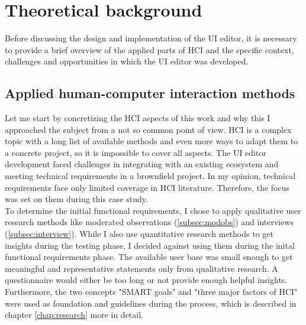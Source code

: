 
%
\chapter{Theoretical background}
\label{chap:background}

Before discussing the design and implementation of the UI editor, it is necessary to provide a brief overview of the applied parts of HCI and the specific context, challenges and opportunities in which the UI editor was developed.
% 

\section{Applied human-computer interaction methods}

Let me start by concretizing the HCI aspects of this work and why this I approached the subject from a not so common point of view.
HCI is a complex topic with a long list of available methods and even more ways to adapt them to a concrete project, so it is impossible to cover all aspects.
The UI editor development faced challenges in integrating with an existing ecosystem and meeting technical requirements in a \gls{brownfield} project.
In my opinion, technical requirements face only limited coverage in HCI literature.
Therefore, the focus was set on them during this case study.
\\
To determine the initial functional requirements, I chose to apply qualitative user research methods like moderated observations (\ref{subsec:modobs}) and interviews (\ref{subsec:interview}).
While I also use quantitative research methods to get insights during the testing phase, I decided against using them during the inital functional requirements phase.
The available user base was small enough to get meaningful and representative statements only from qualitative research.
A questionnaire would either be too long or not provide enough helpful insights.
\\
Furthermore, the two concepts "SMART goals" and "three major factors of HCI" were used as foundation and guidelines during the process, which is described in chapter \ref{chap:research} more in detail.

